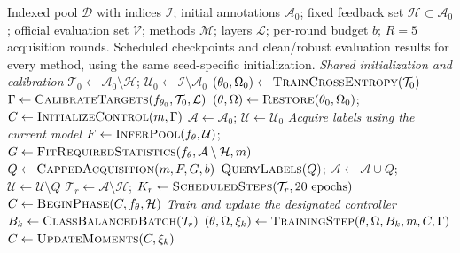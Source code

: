 \documentclass[10pt,a4paper,twocolumn]{article}
\newcommand{\model}{C\AE{}NL}
\begin{document}
\begin{algorithm*}[tbp]
\small

\caption{\textbf{\model{} active learning in the original classification study}}
\label{alg:caenl_loop}
\begin{algorithmic}[1]
\Require Indexed pool $\mathcal D$ with indices $\mathcal I$; initial annotations $\mathcal A_0$; fixed feedback
set $\mathcal H\subset\mathcal A_0$; official evaluation set $\mathcal V$;
methods $\mathcal M$; layers $\mathcal L$; per-round budget $b$; $R=5$ acquisition rounds.
\Ensure Scheduled checkpoints and clean/robust evaluation results for every
method, using the same seed-specific initialization.
\Statex \textit{Shared initialization and calibration}
\State $\mathcal T_0\gets\mathcal A_0\setminus\mathcal H$;
       $\mathcal U_0\gets\mathcal I\setminus\mathcal A_0$
\State $(\theta_0,\Omega_0)\gets\Call{TrainCrossEntropy}{\mathcal T_0}$
\State $\Gamma\gets\Call{CalibrateTargets}{f_{\theta_0},\mathcal T_0,\mathcal L}$
    \State $(\theta,\Omega)\gets\Call{Restore}{\theta_0,\Omega_0}$;
        $C\gets\Call{InitializeControl}{m,\Gamma}$
    \State $\mathcal A\gets\mathcal A_0$; $\mathcal U\gets\mathcal U_0$
        \Statex \hspace{2.6em}\textit{Acquire labels using the current model}
        \State $F\gets\Call{InferPool}{f_\theta,\mathcal U}$;
            $G\gets\Call{FitRequiredStatistics}{f_\theta,\mathcal A\setminus\mathcal H,m}$
        \State $Q\gets\Call{CappedAcquisition}{m,F,G,b}$
        \State $\Call{QueryLabels}{Q}$;
            $\mathcal A\gets\mathcal A\cup Q$;
            $\mathcal U\gets\mathcal U\setminus Q$
        \State $\mathcal T_r\gets\mathcal A\setminus\mathcal H$;
            $K_r\gets\Call{ScheduledSteps}{\mathcal T_r,20\ \mathrm{epochs}}$
        \State $C\gets\Call{BeginPhase}{C,f_\theta,\mathcal H}$
        \Statex \hspace{2.6em}\textit{Train and update the designated controller}
            \State $B_k\gets\Call{ClassBalancedBatch}{\mathcal T_r}$
            \State $(\theta,\Omega,\xi_k)\gets\Call{TrainingStep}{\theta,\Omega,B_k,m,C,\Gamma}$
            \State $C\gets\Call{UpdateMoments}{C,\xi_k}$

\end{algorithmic}
\end{algorithm*}
\end{document}

